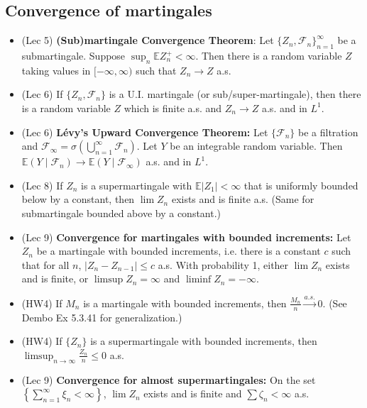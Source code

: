 \documentclass[twoside]{article}
\newcommand{\dis}{\displaystyle}
\newcommand\bbE{\mathbb{E}}
\newcommand\calF{\mathcal{F}}
\newcommand\sg{\sigma}
\newcommand\goesto{\rightarrow}
\begin{document}
\subsection*{Convergence of martingales}
\begin{itemize}
\item (Lec 5) \textbf{(Sub)martingale Convergence Theorem}: Let $\{Z_n, \calF_n \}_{n=1}^\infty$ be a submartingale. Suppose $\dis\sup_n \bbE Z_n^+ < \infty$. Then there is a random variable $Z$ taking values in $[-\infty, \infty)$ such that $Z_n \goesto Z$ a.s.

\item (Lec 6) If $\{ Z_n, \calF_n \}$ is a U.I. martingale (or sub/super-martingale), then there is a random variable $Z$ which is finite a.s. and $Z_n \rightarrow Z$ a.s. and in $L^1$.

\item (Lec 6) \textbf{L\'{e}vy's Upward Convergence Theorem:} Let $\{ \calF_ n \}$ be a filtration and $\calF_\infty = \sg \left( \dis\bigcup_{n=1}^\infty \calF_n \right)$. Let $Y$ be an integrable random variable. Then $\bbE (Y \mid \calF_n) \goesto \bbE (Y \mid \calF_\infty)$ a.s. and in $L^1$.

\item (Lec 8) If $Z_n$ is a supermartingale with $\bbE|Z_1| < \infty$ that is uniformly bounded below by a constant, then $\lim Z_n$ exists and is finite a.s. (Same for submartingale bounded above by a constant.)

\item (Lec 9) \textbf{Convergence for martingales with bounded increments:} Let $Z_n$ be a martingale with bounded increments, i.e. there is a constant $c$ such that for all $n$, $|Z_n - Z_{n-1}| \leq c$ a.s. With probability 1, either $\lim Z_n$ exists and is finite, or $\limsup Z_n = \infty$ and $\liminf Z_n = -\infty$.

\item (HW4) If $M_n$ is a martingale with bounded increments, then $\dis\frac{M_n}{n} \stackrel{a.s.}{\goesto} 0$. (See Dembo Ex 5.3.41 for generalization.)

\item (HW4) If $\{ Z_n\}$ is a supermartingale with bounded increments, then $\dis\limsup_{n \goesto \infty} \frac{Z_n}{n} \leq 0$ a.s.

\item (Lec 9) \textbf{Convergence for almost supermartingales:} On the set $\dis\left\{ \sum_{n=1}^\infty \xi_n < \infty \right\}$, $\lim Z_n$ exists and is finite and $\dis\sum \zeta_n < \infty$ a.s.


\end{itemize}
\end{document}
